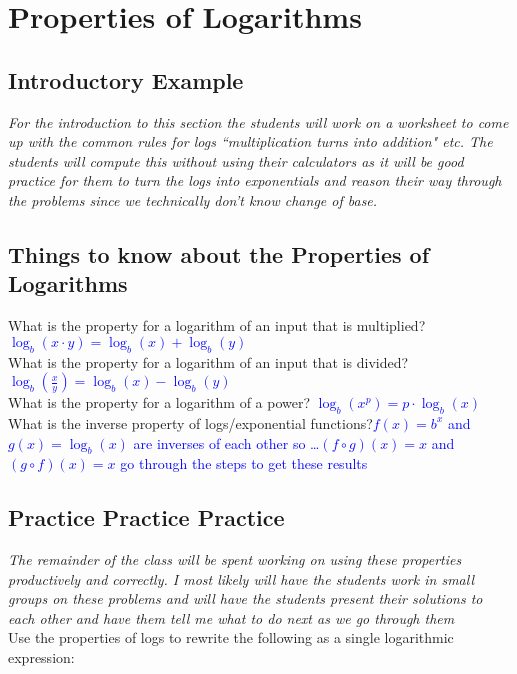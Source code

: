 \documentclass[11pt]{scrartcl}
\theoremstyle{definition}
\begin{document}

\section*{Properties of Logarithms}
\subsection*{Introductory Example}
\textit{For the introduction to this section the students will work on a worksheet to come up with the common rules for logs ``multiplication turns into addition" etc. The students will compute this without using their calculators as it will be good practice for them to turn the logs into exponentials and reason their way through the problems since we technically don't know change of base.}

\subsection*{Things to know about the Properties of Logarithms}
What is the property for a logarithm of an input that is multiplied? \textcolor{blue}{$\log_b(x \cdot y)=\log_b(x)+\log_b(y)$}  \\
What is the property for a logarithm of an input that is divided? \textcolor{blue}{$\log_b \left(\frac{x}{y}\right) = \log_b(x)-\log_b(y)$} \\
What is the property for a logarithm of a power? \textcolor{blue}{$\log_b(x^p)=p \cdot \log_b(x)$ } \\
What is the inverse property of logs/exponential functions?\textcolor{blue}{$f(x)=b^x$ and $g(x)= \log_b(x)$ are inverses of each other so \ldots $(f \circ g)(x)=x$ and $(g \circ f)(x)=x$ go through the steps to get these results}\\

\subsection*{Practice Practice Practice}
\textit{The remainder of the class will be spent working on using these properties productively and correctly. I most likely will have the students work in small groups on these problems and will have the students present their solutions to each other and have them tell me what to do next as we go through them}\\

\noindent
Use the properties of logs to rewrite the following as a single logarithmic expression:\\
\end{document}
